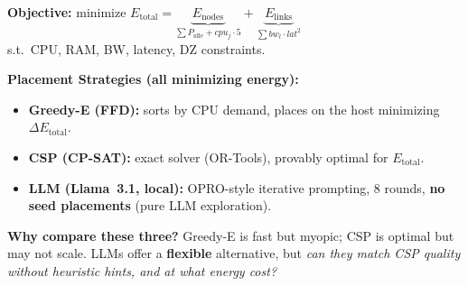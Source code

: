 \documentclass[a0paper,portrait]{baposter}
\begin{document}
\begin{poster}
{{\begin{minipage}[t]{0.34\linewidth}
\end{minipage}

\begin{center}
\colorbox{benchmarkcol!12}{\parbox{0.90\linewidth}{\centering\footnotesize%
\textbf{Objective:} minimize $E_{\text{total}} = \underbrace{E_{\text{nodes}}}_{\sum P_{\text{idle}} + cpu_j \cdot 5} + \underbrace{E_{\text{links}}}_{\sum bw_l \cdot lat^2}$
\\ s.t.\ CPU, RAM, BW, latency, DZ constraints.%
}}
\end{center}

\vspace{-0.1cm}

\textcolor{labelcol}{\textbf{Placement Strategies (all minimizing energy):}}
\vspace{-0.1cm}
\begin{itemize}[leftmargin=*, itemsep=-2pt]
\item \textbf{Greedy-E (FFD):} sorts by CPU demand, places on the host minimizing $\Delta E_{\text{total}}$.
  \item \textbf{CSP (CP-SAT):} exact solver (OR-Tools), provably optimal for $E_{\text{total}}$.
  \item \textbf{LLM (Llama~3.1, local):} OPRO-style iterative prompting, 8 rounds, \textbf{no seed placements} (pure LLM exploration).
\end{itemize}

\vspace{0.1cm}

\textcolor{labelcol}{\textbf{Why compare these three?}}
Greedy-E is fast but myopic; CSP is optimal but may not scale.
LLMs offer a \textbf{flexible} alternative, but \textit{can they match CSP quality without heuristic hints, and at what energy cost?}

}}

{
}
\end{poster}
\end{document}
